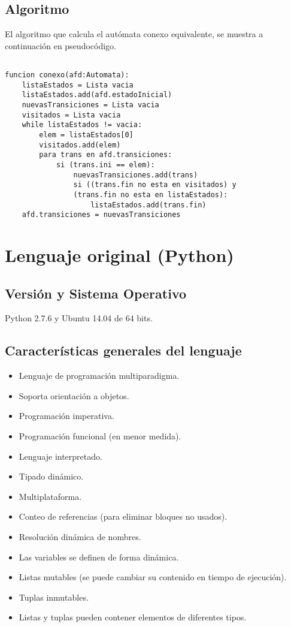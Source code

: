 \documentclass[12pt,a4paper]{article}
\begin{document}
\subsection{Algoritmo}
El algoritmo que calcula el autómata conexo equivalente, se muestra a 
continuación en pseudocódigo.
\begin{lstlisting}

funcion conexo(afd:Automata):
	listaEstados = Lista vacia
	listaEstados.add(afd.estadoInicial)
	nuevasTransiciones = Lista vacia
	visitados = Lista vacia
	while listaEstados != vacia:
		elem = listaEstados[0]
		visitados.add(elem)
		para trans en afd.transiciones:
			si (trans.ini == elem):
				nuevasTransiciones.add(trans)
				si ((trans.fin no esta en visitados) y
				(trans.fin no esta en listaEstados):
					listaEstados.add(trans.fin)
	afd.transiciones = nuevasTransiciones

\end{lstlisting}


\section{Lenguaje original (Python)}

\subsection{Versión y Sistema Operativo}
Python 2.7.6 y Ubuntu 14.04 de 64 bits.


\subsection{Características generales del lenguaje}

\begin{itemize}
\item Lenguaje de programación multiparadigma.
\item Soporta orientación a objetos.
\item Programación imperativa.
\item Programación funcional (en menor medida).
\item Lenguaje interpretado.
\item Tipado dinámico.
\item Multiplataforma.
\item Conteo de referencias (para eliminar bloques no usados).
\item Resolución dinámica de nombres.
\item Las variables se definen de forma dinámica.
\item Listas mutables (se puede cambiar su contenido en tiempo de ejecución).
\item Tuplas inmutables.
\item Listas y tuplas pueden contener elementos de diferentes tipos.
\end{itemize}
\end{document}
